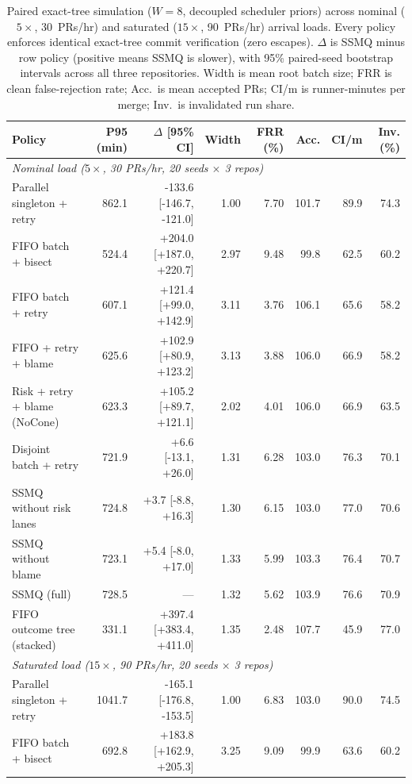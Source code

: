\begin{table}[t]\centering\scriptsize
\caption{Paired exact-tree simulation ($W{=}8$, decoupled scheduler priors) across nominal ($5\times$, 30~PRs/hr) and saturated ($15\times$, 90~PRs/hr) arrival loads. Every policy enforces identical exact-tree commit verification (zero escapes). $\Delta$ is SSMQ minus row policy (positive means SSMQ is slower), with 95\% paired-seed bootstrap intervals across all three repositories. Width is mean root batch size; FRR is clean false-rejection rate; Acc.\ is mean accepted PRs; CI/m is runner-minutes per merge; Inv.\ is invalidated run share.}\label{tab:v7sim}
\begin{tabular}{lrrrrrrr}\toprule
Policy & P95 (min) & $\Delta$ [95\% CI] & Width & FRR (\%) & Acc. & CI/m & Inv. (\%) \\ \midrule
\multicolumn{8}{l}{\textit{Nominal load ($5\times$, 30 PRs/hr, 20 seeds $\times$ 3 repos)}} \\
Parallel singleton + retry & 862.1 & -133.6 [-146.7, -121.0] & 1.00 & 7.70 & 101.7 & 89.9 & 74.3 \\
FIFO batch + bisect & 524.4 & +204.0 [+187.0, +220.7] & 2.97 & 9.48 & 99.8 & 62.5 & 60.2 \\
FIFO batch + retry & 607.1 & +121.4 [+99.0, +142.9] & 3.11 & 3.76 & 106.1 & 65.6 & 58.2 \\
FIFO + retry + blame & 625.6 & +102.9 [+80.9, +123.2] & 3.13 & 3.88 & 106.0 & 66.9 & 58.2 \\
Risk + retry + blame (NoCone) & 623.3 & +105.2 [+89.7, +121.1] & 2.02 & 4.01 & 106.0 & 66.9 & 63.5 \\
Disjoint batch + retry & 721.9 & +6.6 [-13.1, +26.0] & 1.31 & 6.28 & 103.0 & 76.3 & 70.1 \\
SSMQ without risk lanes & 724.8 & +3.7 [-8.8, +16.3] & 1.30 & 6.15 & 103.0 & 77.0 & 70.6 \\
SSMQ without blame & 723.1 & +5.4 [-8.0, +17.0] & 1.33 & 5.99 & 103.3 & 76.4 & 70.7 \\
SSMQ (full) & 728.5 & --- & 1.32 & 5.62 & 103.9 & 76.6 & 70.9 \\
FIFO outcome tree (stacked) & 331.1 & +397.4 [+383.4, +411.0] & 1.35 & 2.48 & 107.7 & 45.9 & 77.0 \\
\midrule
\multicolumn{8}{l}{\textit{Saturated load ($15\times$, 90 PRs/hr, 20 seeds $\times$ 3 repos)}} \\
Parallel singleton + retry & 1041.7 & -165.1 [-176.8, -153.5] & 1.00 & 6.83 & 103.0 & 90.0 & 74.5 \\
FIFO batch + bisect & 692.8 & +183.8 [+162.9, +205.3] & 3.25 & 9.09 & 99.9 & 63.6 & 60.2 \\

\end{tabular}
\end{table}
